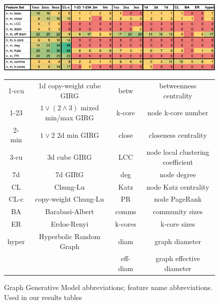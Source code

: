 \begin{figure}
    \centering
    \includegraphics[width=\textwidth]{./figures/Blasius_framework_table.png}
    \caption{\cite{blasius2018towards} GGM realism framework results on Facebook graphs, extended to different GIRG models. Shown here are distribution based features, i.e. including mean, median, lower quartile, upper quartile and standard deviation of node level features.
    Some models are missing from the table e.g. 3d-6d GIRGs as their results follow a trend from low to high dimension.
    }
    \label{fig:blasius_framework_table}
    \vspace{1em}
    \centering
    \begin{tabular}{|c|c||c|c|}
        \hline
        1-ccu & 1d copy-weight cube GIRG 
        & betw & betweenness centrality
        \\
        1-23 & $1 \lor (2 \land 3)$ mixed min/max GIRG
        & k-core & node k-core number
        \\
        2-min & $1 \lor 2$ 2d min GIRG
        & close & closeness centrality
        \\
        3-cu & 3d cube GIRG
        & LCC & node local clustering coefficient
        \\
        7d & 7d GIRG
        & deg & node degree
        \\
        CL & Chung-Lu
        & Katz & node Katz centrality
        \\
        CL-c & copy-weight Chung-Lu
        & PR & node PageRank
        \\
        BA & Barabasi-Albert
        & comms & community sizes
        \\
        ER & Erdos-Renyi
        & k-cores & k-core sizes
        \\
        hyper & Hyperbolic Random Graph &
        diam & graph diameter
        \\
        && eff-diam & graph effective diameter\\
        \hline
    \end{tabular}
    \caption{Graph Generative Model abbreviations; feature name abbreviations. Used in our results tables}
\end{figure}

